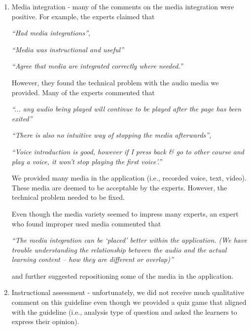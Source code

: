 \begin{enumerate}
\item Media integration - many of the comments on the media integration were positive. For example, the experts claimed that
\begin{addmargin}[1.5em]{1.5em}
\textit{``Had media integrations''},\end{addmargin} 
\begin{addmargin}[1.5em]{1.5em}
\textit{``Media was instructional and useful''}\end{addmargin} 
\begin{addmargin}[1.5em]{1.5em}
\textit{``Agree that media are integrated correctly where needed.''}\end{addmargin} 

However, they found the technical problem with the audio media we provided. Many of the experts commented that 
\begin{addmargin}[1.5em]{1.5em}
\textit{``... any audio being played will continue to be played after the page has been exited''}\end{addmargin} 
\begin{addmargin}[1.5em]{1.5em}
\textit{``There is also no intuitive way of stopping the media afterwards''},\end{addmargin}
\begin{addmargin}[1.5em]{1.5em}
\textit{``Voice introduction is good, however if I press back \& go to other course and play a voice, it won't stop playing the first voice'.''}\end{addmargin}

We provided many media in the application (i.e., recorded voice, text, video). These media are deemed to be acceptable by the experts. However, the technical problem needed to be fixed. 

Even though the media variety seemed to impress many experts, an expert who found improper used media commented that 
\begin{addmargin}[1.5em]{1.5em}
\textit{``The media integration can be `placed' better within the application. (We have trouble understanding the relationship between the audio and the actual learning content – how they are different or overlap)''}\end{addmargin}

and further suggested repositioning some of the media in the application. 

\item Instructional assessment - unfortunately, we did not receive much qualitative comment on this guideline even though we provided a quiz game that aligned with the guideline (i.e., analysis type of question and asked the learners to express their opinion). 


\end{enumerate}
